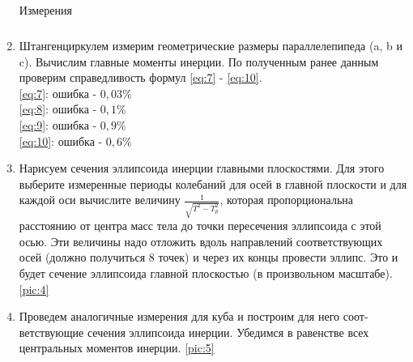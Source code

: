 \documentclass[a4paper,12pt]{article} %
\begin{document}
\begin{enumerate}
\begin{table} [H]
\begin{tabular}{l|l|lllll}
\label{tab:1}

\end{tabular}
\caption[Таблица 1]{Измерения}
\end{table}

\item Штангенциркулем измерим геометрические размеры параллелепипе­да (a, b и c). Вычислим главные моменты инерции. По полученным ранее дан­ным проверим справедливость формул \eqref{eq:7} - \eqref{eq:10}. \\
\eqref{eq:7}: ошибка - $0,03\%$ \\
\eqref{eq:8}: ошибка - $0,1\%$ \\
\eqref{eq:9}: ошибка - $0,9\%$ \\
\eqref{eq:10}: ошибка - $0,6\%$ \\

\item  Нарисуем  сечения  эллипсоида  инерции  главными  плоскостями.  Для этого  выберите  измеренные  периоды колебаний  для  осей  в  главной плоскости и для каждой оси вычислите величину $\frac{1}{\sqrt{T^2 - T_p^2}}$, которая пропорциональна расстоянию  от  центра масс  тела до точки  пересече­ния эллипсоида с этой осью.  Эти величины надо отложить вдоль направлений соот­ветствующих осей (должно получиться 8 точек) и через их концы про­вести  эллипс.  Это и будет  сечение  эллипсоида главной  плоскостью  (в произвольном масштабе). \ref{pic:4}

\item Проведем аналогичные измерения для куба и построим для него соот­ветствующие сечения эллипсоида инерции. Убедимся в равенстве всех центральных моментов инерции. \ref{pic:5}

\newpage


\end{enumerate}
\end{document}
